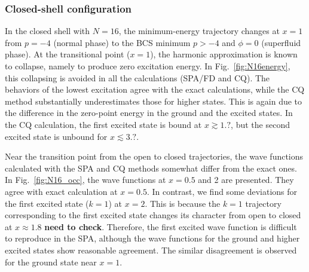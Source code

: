 \documentclass[%
superscriptaddress,
preprint,
showpacs,
nofootinbib,
amsmath,amssymb,
prc,
floatfix ]%
{revtex4-1}
\begin{document}
\subsubsection{Closed-shell configuration}

In the closed shell with $N=16$,
the minimum-energy trajectory changes at $x=1$ from
$p=-4$ (normal phase) to
the BCS minimum $p>-4$ and $\phi=0$ (superfluid phase).
At the transitional point ($x=1$), the harmonic approximation is
known to collapse, namely to produce zero excitation energy.
In Fig.~\ref{fig:N16energy},
this collapsing is avoided in all the calculations (SPA/FD and CQ).
The behaviors of the lowest excitation agree with the exact calculations,
while the CQ method substantially underestimates those for higher states.
This is again due to the difference in the zero-point energy in
the ground and the excited states.
In the CQ calculation, the first excited state is bound at $x\gtrsim 1.?$,
but the second excited state is unbound for $x\lesssim 3.?$.

Near the transition point from the open to closed trajectories,
the wave functions calculated with the SPA and CQ methods somewhat differ
from the exact ones.
In Fig.~\ref{fig:N16_occ}, the wave functions at $x=0.5$ and 2 are presented.
They agree with exact calculation at $x=0.5$.
In contrast, we find some deviations for the first excited state ($k=1$)
at $x=2$.
This is because the $k=1$ trajectory corresponding to the first excited state
changes its character from open to closed at $x\approx 1.8$ {\bf need to check}.
Therefore, the first excited wave function is difficult to reproduce in
the SPA, although the wave functions for
the ground and higher excited states show reasonable agreement.
The similar disagreement is observed for the ground state near $x=1$.

\end{document}

